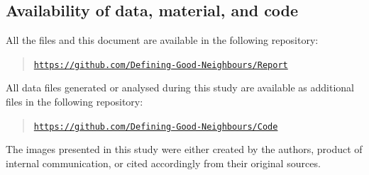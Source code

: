 \documentclass[11pt]{article}
\numberwithin{equation}{section}
\begin{document}
\subsection{Availability of data, material, and code}
\label{app:one}
All the files and this document are available in the following repository:
\begin{quote}
    \noindent \href{https://github.com/Defining-Good-Neighbours/}{\texttt{https://github.com/Defining-Good-Neighbours/Report}}
\end{quote}

All data files generated or analysed during this study are available as additional files in the following repository:
\begin{quote}
    \noindent \href{https://github.com/Defining-Good-Neighbours/}{\texttt{https://github.com/Defining-Good-Neighbours/Code}}
\end{quote}

The images presented in this study were either created by the authors, product of internal communication, or cited accordingly from their original sources.
\end{document}
